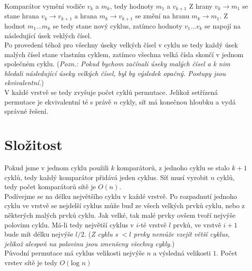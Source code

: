 \documentclass{scrartcl}
\begin{document}
Komparátor vymění vodiče $v_k$ a $m_k$, tedy hodnoty $m_1$ a $v_{k+1}$ Z hrany $v_k\rightarrow m_1$ se stane hrana $v_k\rightarrow v_{k+1}$ a hrana $m_k\rightarrow v_{k+1}$ se změní na hranu $m_k\rightarrow m_1$. Z hodnot $m_1 ... m_k$ se tedy stane nový cyklus, zatímco hodnoty $v_1 ... v_k$ se napojí na následující úsek veklých čísel.\\

Po provedení téhož pro všechny úseky velkých čísel v cyklu se tedy každý úsek malých čísel stane vlastním cyklem, zatímco všechna velká čísla skončí v jednom společném cyklu. (\textit{Pozn.: Pokud bychom začínali úseky malých čísel a k nim hledali následující úseky velkých čísel, byl by výsledek opačný. Postupy jsou ekvivalentní.})\\

V každé vrstvě se tedy zvyšuje počet cyklů permutace. Jelikož setřízená permutace je ekvivalentní té s právě $n$ cykly, síť má konečnou hloubku a vydá správné řešení.

\section{Složitost}
Pokud jsme v jednom cyklu použili $k$ komparátorů, z jednoho cyklu se stalo $k+1$ cyklů, tedy každý komparátor přidává jeden cyklus. Síť musí vyrobit $n$ cyklů, tedy počet komparátorů sítě je $O(n)$.\\

Podívejme se na délku největšího cyklu v každé vrstvě. Po rozpadnutí jednoho cyklu ve vrstvě se nejdelší cyklus může buď ze všech velkých prvků cyklu, nebo z některých malých prvků cyklu. Jak velké, tak malé prvky ovšem tvoří nejvýše polovinu cyklu. Má-li tedy největší cyklus v $i$-té vrstvě $l$ prvků, ve vrstvě $i+1$ bude mít délku nejvýše $l/2$. (\textit{Z cyklu s $< l$ prvky nemůže vzejít větší cyklus, jelikož alespoň na polovinu jsou zmenšeny všechny cykly.})\\

Původní permutace má cyklus velikosti nejvýše $n$ a výsledná velikosti $1$. Počet vrstev sítě je tedy $O(\text{log }n)$
\end{document}
